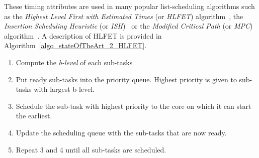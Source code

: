 \documentclass[main.tex]{subfiles}
\begin{document}
These timing attributes are used in many popular list-scheduling algorithms
such as the \emph{Highest Level First with Estimated Times} (or \emph{HLFET})
algorithm~\cite{Adam1974}, the \emph{Insertion Scheduling Heuristic} (or
\emph{ISH})~\cite{Kruatrachue1987} or the \emph{Modified Critical Path} (or
\emph{MPC}) algorithm~\cite{Wu1990}. A description of HLFET is provided in
Algorithm~\ref{algo_stateOfTheArt_2_HLFET}. 


\begin{algo}[HLFET] 
    \hfill
    \begin{enumerate}
        \item Compute the \emph{b-level} of each sub-tasks
        \item Put ready sub-tasks into the priority queue. Highest priority is
            given to sub-tasks with largest b-level.
        \item Schedule the sub-task with highest priority to the core on which
            it can start the earliest.
        \item Update the scheduling queue with the sub-tasks that are now ready.
        \item Repeat 3 and 4 until all sub-tasks are scheduled.
    \end{enumerate}
    \label{algo_stateOfTheArt_2_HLFET}
\end{algo}
\end{document}
